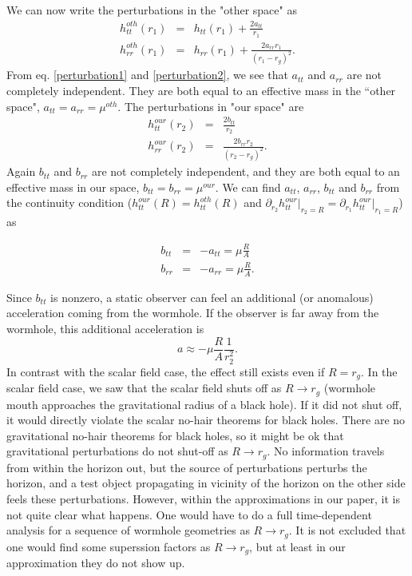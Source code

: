 \documentclass[prd, amsfonts, twocolumn, nofootinbib, showpacs]{revtex4}
\begin{document}
We can now write the perturbations in the "other space" as
\begin{eqnarray}
h^{oth}_{tt}(r_1)&=&h_{tt}(r_1)+\frac{2a_{tt}}{r_1}\\
h^{oth}_{rr}(r_1)&=&h_{rr}(r_1)+\frac{2a_{rr} r_1 }{(r_1-r_g)^2} .
\end{eqnarray}
From eq. \eqref{perturbation1} and \eqref{perturbation2}, we see that $a_{tt}$ and $a_{rr}$ are not completely independent. They are both equal to an effective mass in the ``other space", $a_{tt}=a_{rr}=\mu^{oth}$. The perturbations in "our space" are
\begin{eqnarray}
h^{our}_{tt}(r_2)&=&\frac{2b_{tt}}{r_2}\\
h^{our}_{rr}(r_2)&=&\frac{2b_{rr} r_2 }{(r_2-r_g)^2} .
\end{eqnarray}
Again $b_{tt}$ and $b_{rr}$ are not completely independent, and they are both equal to an effective mass in our space, $b_{tt}=b_{rr}=\mu^{our}$. We can find $a_{tt}$, $a_{rr}$, $b_{tt}$ and $b_{rr}$ from the continuity condition ($h^{our}_{tt}(R)=h^{oth}_{tt}(R)$ and $\partial_{r_2}h^{our}_{tt}\vert_{r_2=R}=\partial_{r_1}h^{our}_{tt}\vert_{r_1=R}$) as

\begin{eqnarray}
b_{tt}&=&-a_{tt}=\mu \frac{R}{A}\\
b_{rr}&=&-a_{rr}=\mu \frac{R }{A} .
\end{eqnarray}

Since $b_{tt}$ is nonzero, a static observer can feel an additional (or anomalous) acceleration coming from the wormhole. If the observer is far away from the wormhole, this additional acceleration is
\begin{equation}
\label{acceleration}
a\approx-\mu \frac{R}{A}\frac{1}{r_2^2} .
\end{equation}
In contrast with the scalar field case, the effect still exists even if $R=r_g$. 
In the scalar field case, we saw that the scalar field shuts off as $R\rightarrow r_g$ (wormhole mouth approaches the gravitational radius of a black hole).   If it did not shut off, it would directly violate the scalar no-hair theorems for black holes. There are no gravitational no-hair theorems for black holes, so it might be ok that gravitational perturbations do not shut-off as $R\rightarrow r_g$. No information travels from within the horizon out, but the source of perturbations perturbs the horizon, and a test object propagating in vicinity of the horizon on the other side feels these perturbations. However, within the approximations in our paper, it is not quite clear what happens. One would have to do a full time-dependent analysis for a sequence of wormhole geometries as $R\rightarrow r_g$. It is not excluded that one would find some superssion factors as $R\rightarrow r_g$, but at least in our approximation they do not show up. 
\end{document}
